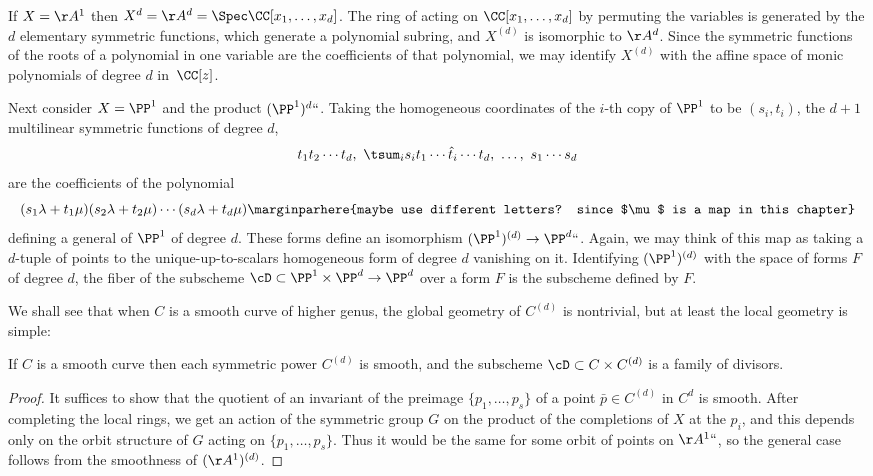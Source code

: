 If $X=\AA^{1}$ then $X^{d} = \AA^{d} = \Spec \CC[x_{1}, \dots,
x_{d}]$. The ring of 
%
acting on
$\CC[x_{1}, \dots, x_{d}]$ by permuting the variables is generated by the $d$ 
%
elementary symmetric functions, which generate a polynomial subring, and $X^{(d)}$ is isomorphic to $\AA^{d}$. Since the symmetric functions of the roots of a polynomial in one variable are the coefficients of
that polynomial, we may identify $X^{(d)}$ with the affine space of
monic polynomials of degree $d$ in~$\CC[z]$.

Next consider $X = \PP^1$ and the product $(\PP^1)^d` `$. Taking the homogeneous coordinates of the
$i$-th copy of $\PP^1$ to be $(s_i,t_i)$, the $d+1$ multilinear symmetric functions of degree $d$,
$$
t_1t_2\cdots t_d,\ \tsum_i s_it_1\cdots\hat t_i\cdots t_d,\ \dots,\ s_1\cdots s_d
$$
are the coefficients of the polynomial
$$
(s_1\lambda + t_1\mu)(s_2\lambda + t_2\mu)\cdots(s_d\lambda + t_d\mu)
\marginparhere{maybe use different letters? since $\mu$ is a map in this chapter}
$$
defining a general 
of $\PP^1$ of degree $d$. These forms  define
an isomorphism $(\PP^1)^{(d)} \to \PP^d` `$. 
Again, we may think of this map as taking a $d$-tuple of points to the unique-up-to-scalars
homogeneous form of degree $d$ vanishing on it.
Identifying $(\PP^1)^{(d)}$ with the space of forms
$F$ of degree $d$, the fiber of the subscheme $\cD\subset \PP^1 \times \PP^d \to \PP^d$
over a form $F$ is the subscheme defined by $F$.

We shall see that when $C$ is a smooth curve of higher genus, the global geometry of $C^{(d)}$ is nontrivial, but at least the local geometry is simple:

\begin{proposition}
If $C$ is a smooth curve then each symmetric power $C^{(d)}$ is smooth, and the subscheme
$\cD \subset C\times C^{(d)}$ is a family of divisors.
\unif
\end{proposition}

\begin{proof}
It suffices to
 show that the quotient of an invariant 
of the preimage $\{p_1,\dots, p_s\}$ of a point
 $\bar p\in C^{(d)}$ in $C^d$  is smooth. After completing the local rings, we get an action of the symmetric group
 $G$ on the product of the completions of $X$ at the $p_i$, and this depends only on the orbit
 structure of $G$ acting on $\{p_1,\dots, p_s\}$. Thus it would be the same for some orbit of
 points on $\AA^1` `$, so the general case follows from the smoothness of $(\AA^{1})^{(d)}$.
\unif
 \end{proof}

